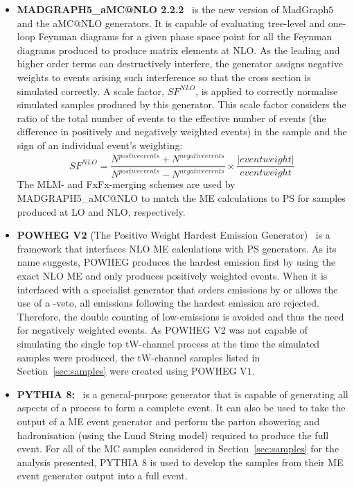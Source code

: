 \begin{itemize}
\item \textbf{MADGRAPH5\_aMC@NLO 2.2.2}~\cite{Alwall:2014hca} is the new version of MadGraph$5$ and the aMC@NLO generators.
It is capable of evaluating tree-level and one-loop Feynman diagrams for a given phase space point for all the Feynman diagrams produced to produce matrix elements at NLO.
As the leading and higher order terms can destructively interfere, the generator assigns negative weights to events arising such interference so that the cross section is simulated correctly.
A scale factor, $SF^{NLO}$, is applied to correctly normalise simulated samples produced by this generator.
This scale factor considers the ratio of the total number of events to the effective number of events (\ie the difference in positively and negatively weighted events) in the sample and the sign of an individual event's weighting:
\begin{equation}
SF^{NLO} = \frac{N^{postive events} + N^{negative events}}{N^{postive events} - N^{negative events}} \times \frac{|event weight|}{event weight} \;
\end{equation}
The MLM- and FxFx-merging schemes are used by MADGRAPH5\_aMC@NLO to match the ME calculations to PS for samples produced at LO and NLO, respectively.

\item \textbf{POWHEG V2} (The Positive Weight Hardest Emission Generator)~\cite{Alioli:2010xd} is a framework that interfaces NLO ME calculations with PS generators.
As its name suggests, POWHEG produces the hardest emission first by using the exact NLO ME and only produces positively weighted events.
When it is interfaced with a specialist generator that orders emissions by \pT or allows the use of a \pT-veto, all emissions following the hardest emission are rejected.
Therefore, the double counting of low-\pT emissions is avoided and thus the need for negatively weighted events.
As POWHEG V2 was not capable of simulating the single top tW-channel process at the time the simulated samples were produced, the tW-channel samples listed in Section~\ref{sec:samples} were created using POWHEG V1.

%


\item \textbf{PYTHIA 8:}~\cite{Sjostrand:2014zea} is a general-purpose generator that is capable of generating all aspects of a process to form a complete event.
It can also be used to take the output of a ME event generator and perform the parton showering and hadronisation (using the Lund String model) required to produce the full event. For all of the MC samples considered in Section~\ref{sec:samples} for the analysis presented, PYTHIA 8 is used to develop the samples from their ME event generator output into a full event. 
\end{itemize}

